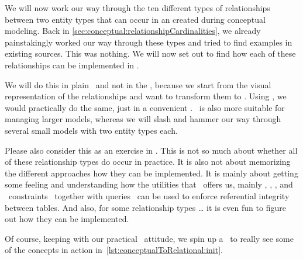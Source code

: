 %
We will now work our way through the ten different types of relationships between two entity types that can occur in an  created during conceptual modeling.
Back in \cref{sec:conceptual:relationshipCardinalities}, we already painstakingly worked our way through these types and tried to find examples in existing sources.
This was nothing.
We will now set out to find how each of these relationships can be implemented in \sql.

We will do this in plain \sql\ and not in the \pgmodeler, because we start from the visual representation of the relationships and want to transform them to \sql.
Using \pgmodeler, we would practically do the same, just in a convenient .
\pgmodeler\ is also more suitable for managing larger models, whereas we will slash and hammer our way through several small models with two entity types each.

Please also consider this as an exercise in \sql.
This is not so much about whether all of these relationship types do occur in practice.
It is also not about memorizing the different approaches how they can be implemented.
It is mainly about getting some feeling and understanding how the utilities that \sql\ offers us, mainly , , , and ~constraints~\cite{PGDG:PD:C} together with  queries~\cite{PGDG:PD:JT} can be used to enforce referential integrity between tables.
And also, for some relationship types {\dots} it is even fun to figure out how they can be implemented.

Of course, keeping with our practical ~attitude, we spin up a \db\ to really see some of the concepts in action in~\cref{lst:conceptualToRelational:init}.%
%
%
%
\FloatBarrier%
